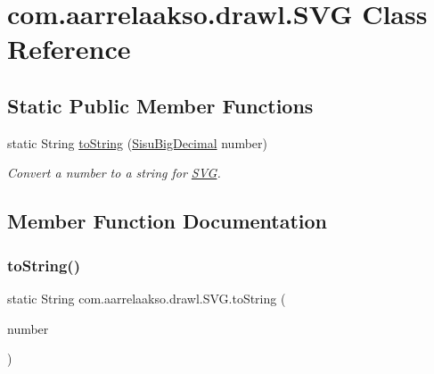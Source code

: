 \hypertarget{classcom_1_1aarrelaakso_1_1drawl_1_1_s_v_g}{}\section{com.\+aarrelaakso.\+drawl.\+S\+VG Class Reference}
\label{classcom_1_1aarrelaakso_1_1drawl_1_1_s_v_g}
\subsection*{Static Public Member Functions}
\begin{DoxyCompactItemize}
\item 
static String \hyperlink{classcom_1_1aarrelaakso_1_1drawl_1_1_s_v_g_a6658c22ded498ee41fdcf637a3cc9dab}{to\+String} (\hyperlink{classcom_1_1aarrelaakso_1_1drawl_1_1_sisu_big_decimal}{Sisu\+Big\+Decimal} number)
\begin{DoxyCompactList}\small\item\em Convert a number to a string for \hyperlink{classcom_1_1aarrelaakso_1_1drawl_1_1_s_v_g}{S\+VG}. \end{DoxyCompactList}\end{DoxyCompactItemize}


\subsection{Member Function Documentation}
\mbox{\label{classcom_1_1aarrelaakso_1_1drawl_1_1_s_v_g_a6658c22ded498ee41fdcf637a3cc9dab}} 
\subsubsection{\texorpdfstring{to\+String()}{toString()}}
{\footnotesize\ttfamily static String com.\+aarrelaakso.\+drawl.\+S\+V\+G.\+to\+String (\begin{DoxyParamCaption}\item[{\hyperlink{classcom_1_1aarrelaakso_1_1drawl_1_1_sisu_big_decimal}{Sisu\+Big\+Decimal}}]{number }\end{DoxyParamCaption})\hspace{0.3cm}{\ttfamily [static]}}




